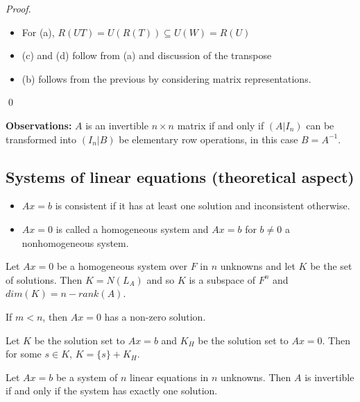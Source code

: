 \documentclass[12pt]{article}
\newenvironment{theorem}[2][Theorem]{\begin{trivlist}
\item[\hskip \labelsep {\bfseries #1}\hskip \labelsep {\bfseries #2.}]}{\end{trivlist}}
\newenvironment{corollary}[2][Corollary]{\begin{trivlist}
\item[\hskip \labelsep {\bfseries #1}\hskip \labelsep {\bfseries #2}]}{\end{trivlist}}
\newenvironment{sol}
    {\emph{Proof.}
    }
    {
    \qed
    }
\begin{document}
\begin{sol}
\begin{itemize}
    \item For (a), $R(UT) = U(R(T)) \subseteq U(W) = R(U)$
    
    \item (c) and (d) follow from (a) and discussion of the transpose
    
    \item (b) follows from the previous by considering matrix representations.
 \end{itemize}
\end{sol}

\textbf{Observations:} $A$ is an invertible $n \times n$ matrix if and only if $(A | I_n)$ can be transformed into $(I_n | B)$ be elementary row operations, in this case $B = A^{-1}$.

\subsection{Systems of linear equations (theoretical aspect)}

\begin{itemize}
    \item $Ax = b$ is consistent if it has at least one solution and inconsistent otherwise.
    
    \item $Ax = 0$ is called a homogeneous system and $Ax = b$ for $b \neq 0$ a nonhomogeneous system.
\end{itemize}

\begin{theorem}{3.8}
Let $Ax = 0$ be a homogeneous system over $F$ in $n$ unknowns and let $K$ be the set of solutions. Then $K = N(L_A)$ and so $K$ is a subspace of $F^n$ and $dim(K) = n - rank(A)$.
\end{theorem}

\begin{corollary}{12}
If $m < n$, then $Ax = 0$ has a non-zero solution.
\end{corollary}

\begin{theorem}{3.9}
Let $K$ be the solution set to $Ax = b$ and $K_H$ be the solution set to $Ax = 0$. Then for some $s \in K$, $K = \{s\} + K_H$.
\end{theorem}

\begin{theorem}{3.10}
Let $Ax = b$ be a system of $n$ linear equations in $n$ unknowns. Then $A$ is invertible if and only if the system has exactly one solution.
\end{theorem}
\end{document}
